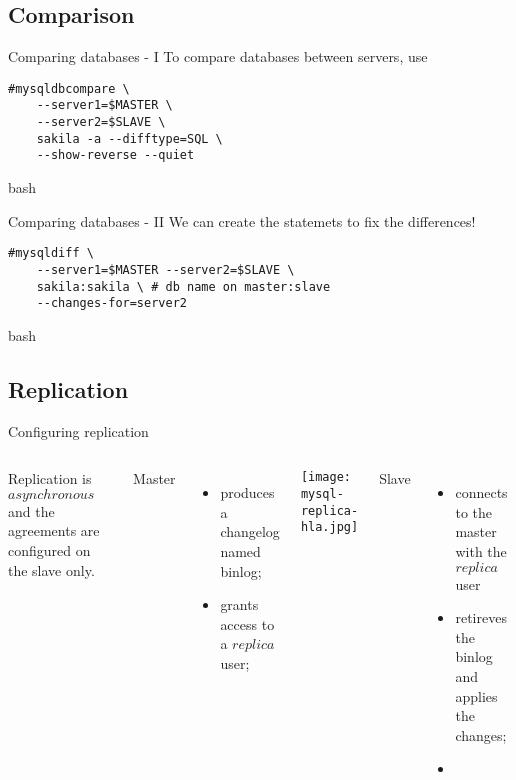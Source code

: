 \documentclass{beamer}[10]
\begin{document}
%
%
\subsection{Comparison}
\begin{pyframe}{Comparing databases - I}
To compare databases between servers, use
\begin{verbatim}
#mysqldbcompare \
    --server1=$MASTER \
    --server2=$SLAVE \
    sakila -a --difftype=SQL \
    --show-reverse --quiet
\end{verbatim}{bash}

\end{pyframe}


\begin{pyframe}{Comparing databases - II}
We can create the statemets to fix the differences!
\begin{verbatim}
#mysqldiff \
    --server1=$MASTER --server2=$SLAVE \
    sakila:sakila \ # db name on master:slave
    --changes-for=server2
\end{verbatim}{bash}
\end{pyframe}


%
%
\subsection{Replication}
\begin{pyframe}{Configuring replication}
\begin{columns}
Replication is $asynchronous$ and the agreements are configured on the slave only.

    {\large Master}
    \begin{itemize}
    \item produces a changelog named binlog;
    \item grants access to a $replica$ user;
    \end{itemize}
\texttt{[image: mysql-replica-hla.jpg]}

    {\large Slave}
    \begin{itemize}
    \item connects to the master with the $replica$ user
    \item retireves the binlog and applies the changes;
    \item \code{START SLAVE;}
    \end{itemize}
\end{columns}
\end{pyframe}
\end{document}
